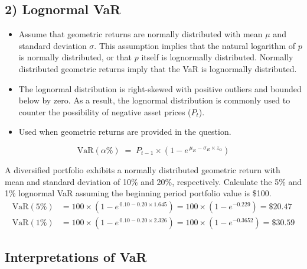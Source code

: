 \subsection{2) Lognormal VaR}
\begin{itemize}
\item Assume that geometric returns are normally distributed with mean $\mu$ and standard
      deviation $\sigma$. This assumption implies that the natural logarithm of $p$ is normally
      distributed, or that $p$ itself is lognormally distributed. Normally distributed geometric
      returns imply that the VaR is lognormally distributed.
\item The lognormal distribution is right-skewed with positive outliers and bounded below by
      zero. As a result, the lognormal distribution is commonly used to counter the possibility
      of negative asset prices ($P_t$).
\item Used when geometric returns are provided in the question.
\end{itemize}

\begin{mrfmlbox}
\[ \mathrm{VaR}(\alpha\%) \;=\; P_{t-1} \times \left( 1 - e^{\,\mu_R - \sigma_R \times z_\alpha} \right) \]
\end{mrfmlbox}

\begin{mrexbox}[title={Example 3 --- lognormal VaR}]
A diversified portfolio exhibits a normally distributed geometric return with mean and standard
deviation of 10\% and 20\%, respectively. Calculate the 5\% and 1\% lognormal VaR assuming the
beginning period portfolio value is \$100.
\tcblower
\small
\begin{align*}
\mathrm{VaR}(5\%) &= 100 \times \left(1 - e^{\,0.10 - 0.20 \times 1.645}\right)
   = 100 \times \left(1 - e^{-0.229}\right) = \$20.47\\
\mathrm{VaR}(1\%) &= 100 \times \left(1 - e^{\,0.10 - 0.20 \times 2.326}\right)
   = 100 \times \left(1 - e^{-0.3652}\right) = \$30.59
\end{align*}
\end{mrexbox}

\subsection{Interpretations of VaR}

